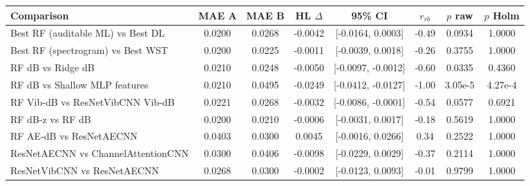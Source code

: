\begin{tabular}{@{}lccccccc@{}}
\toprule
Comparison & MAE A & MAE B & HL $\Delta$ & 95\% CI & $r_{rb}$ & $p$ raw & $p$ Holm \\
\midrule
Best RF (auditable ML) vs Best DL & 0.0200 & 0.0268 & -0.0042 & [-0.0164, 0.0003] & -0.49 & 0.0934 & 1.0000 \\
Best RF (spectrogram) vs Best WST & 0.0200 & 0.0225 & -0.0011 & [-0.0039, 0.0018] & -0.26 & 0.3755 & 1.0000 \\
RF dB vs Ridge dB & 0.0210 & 0.0248 & -0.0050 & [-0.0097, -0.0012] & -0.60 & 0.0335 & 0.4360 \\
RF dB vs Shallow MLP features & 0.0210 & 0.0495 & -0.0249 & [-0.0412, -0.0127] & -1.00 & 3.05e-5 & 4.27e-4 \\
RF Vib-dB vs ResNetVibCNN Vib-dB & 0.0221 & 0.0268 & -0.0032 & [-0.0086, -0.0001] & -0.54 & 0.0577 & 0.6921 \\
RF dB-z vs RF dB & 0.0200 & 0.0210 & -0.0006 & [-0.0031, 0.0017] & -0.18 & 0.5619 & 1.0000 \\
RF AE-dB vs ResNetAECNN & 0.0403 & 0.0300 & 0.0045 & [-0.0016, 0.0266] & 0.34 & 0.2522 & 1.0000 \\
ResNetAECNN vs ChannelAttentionCNN & 0.0300 & 0.0406 & -0.0098 & [-0.0229, 0.0029] & -0.37 & 0.2114 & 1.0000 \\
ResNetVibCNN vs ResNetAECNN & 0.0268 & 0.0300 & -0.0002 & [-0.0123, 0.0093] & -0.01 & 0.9799 & 1.0000 \\
\bottomrule
\end{tabular}
